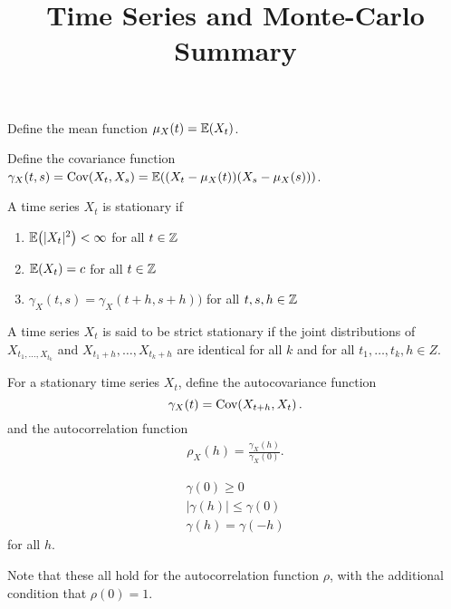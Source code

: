 

\title{Time Series and Monte-Carlo Summary}



\maketitle

\begin{defn}
  \label{defn:time_series:7}
  Define the mean function $\mu_{X}(t) = \E{X_{t}}$.

  Define the covariance function $\gamma_{X}(t, s) = \Cov{X_{t}}{X_{s}}
    = \E{(X_{t} - \mu_{X}(t))(X_{s} - \mu_{X}(s))}$.
\end{defn}

\begin{defn}
  \label{defn:time_series:6}
  A time series $X_{t}$ is stationary if
  \begin{enumerate}
  \item $\E{|X_t|^2} < \infty$ for all $t \in \mathbb{Z}$
  \item $\E{X_{t}} = c$ for all $t \in \mathbb{Z}$
  \item $\gamma_{X}(t, s) = \gamma_{X}(t+h, s+h))$ for all $t, s, h
    \in \mathbb{Z}$
  \end{enumerate}
\end{defn}

\begin{defn}
  \label{defn:time_series:8}
  A time series $X_{t}$ is said to be strict stationary if the joint
  distributions of $X_{t_{1}, \dots, X_{t_{k}}}$ and $X_{t_{1} + h},
  \dots, X_{t_{k} + h}$ are identical for all $k$ and for all $t_{1},
  \dots, t_{k}, h \in Z$.
\end{defn}

\begin{defn}
  \label{defn:time_series:9}
  For a stationary time series $X_{t}$, define the autocovariance
  function
  \begin{equation}
    \label{eq:2}
    \gamma_{X}(t) = \Cov{X_{t+h}}{X_{t}}.
  \end{equation}
  and the autocorrelation function
  \begin{align}
    \label{eq:3}
    \rho_{X}(h) = \frac{\gamma_{X}(h)}{\gamma_{X}(0)}.
  \end{align}
\end{defn}

\begin{lem}
  \begin{align}
    \label{eq:13}
    \gamma(0) \geq 0 \\
    |\gamma(h)| \leq \gamma(0) \\
    \gamma(h) = \gamma(-h)
  \end{align} for all $h$.

  Note that these all hold for the autocorrelation function $\rho$,
  with the additional condition that $\rho(0) = 1$.
\end{lem}

